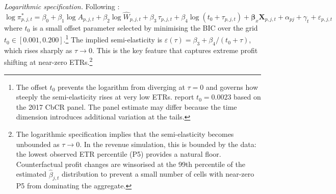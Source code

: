 \documentclass[11pt,a4paper]{article}
\begin{document}
\textit{Logarithmic specification.} Following \citet{garcia-bernardo2024}:
\begin{equation}\label{eq:panel_log}
\log \pi_{p,j,t}^{*} = \beta_0 + \beta_1 \log A_{p,j,t} + \beta_2 \log \hat{W}_{p,j,t} + \beta_3 \, \tau_{p,j,t} + \beta_4 \log(t_0 + \tau_{p,j,t}) + \mathbf{\beta}_x \mathbf{X}_{p,j,t} + \alpha_{pj} + \gamma_t + \varepsilon_{p,j,t}
\end{equation}
where $t_0$ is a small offset parameter selected by minimising the BIC over the grid $t_0 \in [0.001, 0.200]$.\footnote{The offset $t_0$ prevents the logarithm from diverging at $\tau = 0$ and governs how steeply the semi-elasticity rises at very low ETRs. \citet{garcia-bernardo2024} report $t_0 = 0.0023$ based on the 2017 CbCR panel. The panel estimate may differ because the time dimension introduces additional variation at the tails.} The implied semi-elasticity is $\varepsilon(\tau) = \beta_3 + \beta_4 / (t_0 + \tau)$, which rises sharply as $\tau \to 0$. This is the key feature that captures extreme profit shifting at near-zero ETRs.\footnote{The logarithmic specification implies that the semi-elasticity becomes unbounded as $\tau \to 0$. In the revenue simulation, this is bounded by the data: the lowest observed ETR percentile (P5) provides a natural floor. Counterfactual profit changes are winsorised at the 99th percentile of the estimated $\hat{\beta}_{j,t}$ distribution to prevent a small number of cells with near-zero P5 from dominating the aggregate.}
\end{document}
